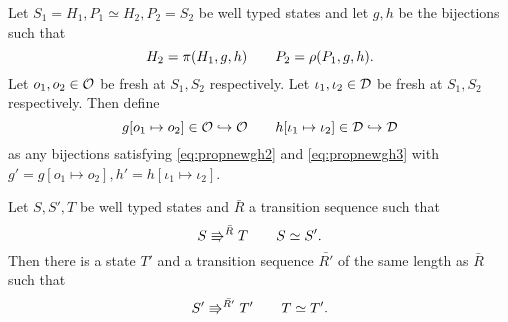 \begin{definition} \label{def:bijectionmod}
  Let $S_1 = H_1, P_1 \simeq H_2, P_2 = S_2$ be well typed states and let $g, h$
  be the bijections such that
  \begin{equation} 
    H_2 = \pi(H_1, g, h) \quad\quad P_2 = \rho(P_1, g, h).
  \end{equation}
  Let $o_1, o_2 \in \mathcal{O}$ be fresh at $S_1, S_2$ respectively.
  Let $\iota_1, \iota_2 \in \mathcal{D}$ be fresh at $S_1, S_2$ respectively.
  Then define
  \begin{equation}
    g[o_1 \mapsto o_2] \in \mathcal{O} \hookrightarrow \mathcal{O} 
    \quad\quad h[\iota_1 \mapsto \iota_2] \in \mathcal{D} \hookrightarrow \mathcal{D}
  \end{equation}
  as any bijections satisfying \eqref{eq:propnewgh2} and \eqref{eq:propnewgh3}
  with $g' = g[o_1 \mapsto o_2], h' = h[\iota_1 \mapsto \iota_2]$.
\end{definition}

\begin{lemma} \label{lem:lemma3}
  Let $S, S', T$ be well typed states and $\bar{R}$ a transition sequence such that
  \begin{equation*}
    S \Rrightarrow^{\bar{R}} T \quad\quad S \simeq S'.
  \end{equation*}
  Then there is a state $T'$ and a transition sequence $\bar{R'}$ of the same
  length as $\bar{R}$ such that
  \begin{equation*}
    S' \Rrightarrow^{\bar{R'}} T' \quad\quad T \simeq T'.
  \end{equation*}
\end{lemma}


